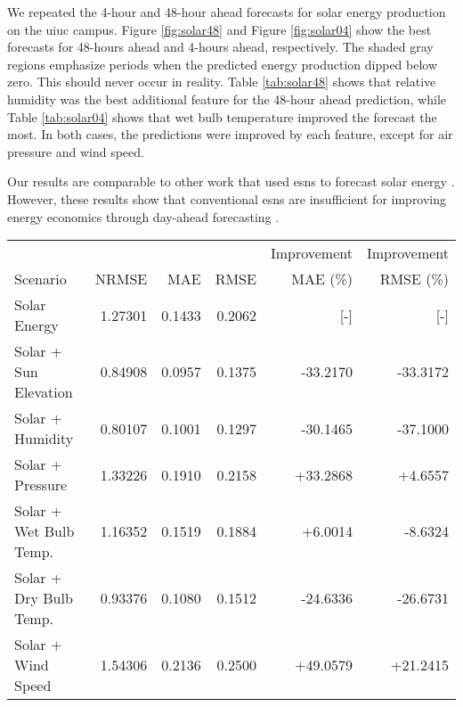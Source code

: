 We repeated the 4-hour and 48-hour ahead forecasts for solar energy production
on the \gls{uiuc} campus. Figure \ref{fig:solar48} and Figure \ref{fig:solar04}
show the best forecasts for 48-hours ahead and 4-hours ahead, respectively. The
shaded gray regions emphasize periods when   the predicted energy production dipped
below zero. This should never occur in reality. Table \ref{tab:solar48} shows
that relative humidity was the best additional feature for the 48-hour ahead
prediction, while Table \ref{tab:solar04} shows that wet bulb temperature
improved the forecast the most. In both cases, the predictions were improved
by each feature, except for air pressure and wind speed.

Our results are comparable to other work that used \glspl{esn} to forecast
solar energy \cite{li_echo_2019}.
However, these results show that conventional \glspl{esn} are insufficient for
improving energy economics through day-ahead forecasting
\cite{brancucci_martinez-anido_value_2016}.

\begin{figure*}[h]
  \centering
  
  \caption{The optimized 48-hour ahead solar energy prediction. The inputs for
  this forecast were solar energy and relative humidity.
  : Reservoir Size: 800, Sparsity: 0.2, Spectral Radius:
  1.5, Noise: 0.0001, Training Length: 5000, Prediction Window: 48, Random
  state: 85}
  \label{fig:solar48}
\end{figure*}

\begin{table*}[h]
  \centering
  \caption{Tabulated error for 48-hour ahead solar energy forecasts with
  various coupled quantities.}
  \label{tab:solar48}
  \begin{tabular}{lrrrrr}
    \hline
    & & & & Improvement & Improvement \\
    Scenario &NRMSE & MAE & RMSE & MAE (\%) & RMSE (\%)\\
    \hline
    Solar Energy & 1.27301 & 0.1433 &0.2062 & [-] & [-] \\
    Solar + Sun Elevation & 0.84908 & 0.0957 & 0.1375 &  -33.2170 & -33.3172 \\
    Solar + Humidity & 0.80107 & 0.1001 & 0.1297 & -30.1465 & -37.1000 \\
    Solar + Pressure & 1.33226 & 0.1910 & 0.2158 & +33.2868 & +4.6557 \\
    Solar + Wet Bulb Temp. & 1.16352 & 0.1519 & 0.1884 & +6.0014 & -8.6324 \\
    Solar + Dry Bulb Temp. & 0.93376 & 0.1080 & 0.1512 & -24.6336 & -26.6731 \\
    Solar + Wind Speed & 1.54306 & 0.2136 & 0.2500 & +49.0579 & +21.2415 \\
    \hline
  \end{tabular}
\end{table*}
\FloatBarrier
